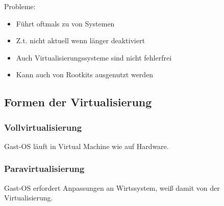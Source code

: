 Probleme:
\begin{itemize}
    \item Führt oftmals zu  von Systemen
    \item Z.t. nicht aktuell wenn länger deaktiviert
    \item Auch Virtualisierungssysteme sind nicht fehlerfrei
    \item Kann auch von Rootkits ausgenutzt werden
\end{itemize}

\subsection{Formen der Virtualisierung}
\subsubsection{Vollvirtualisierung}
Gast-OS läuft in Virtual Machine wie auf  Hardware.

\subsubsection{Paravirtualisierung}
Gast-OS erfordert Anpassungen an Wirtssystem, weiß damit von der Virtualisierung.

